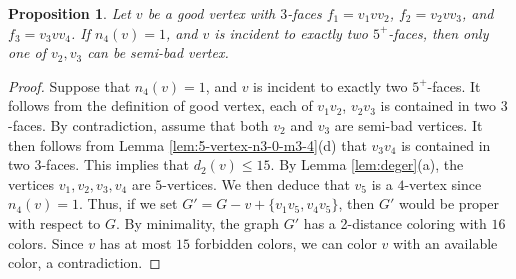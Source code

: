 \documentclass[12pt, reqno]{amsart}
\theoremstyle{plain}
\newtheorem{proposition}[equation]{Proposition}
\theoremstyle{definition}
\numberwithin{equation}{section}
\begin{document}
\begin{proposition}\label{prop:good-no-two-semi-bad}
Let $v$ be a good vertex with $3$-faces $f_1=v_1vv_2$, $f_2=v_2vv_3$, and $f_3=v_3vv_4$. If $n_4(v)=1$, and $v$ is incident to exactly two $5^+$-faces, then only one of $v_2,v_3$ can be semi-bad vertex. 
\end{proposition}
\begin{proof}
Suppose that $n_4(v)=1$, and $v$ is incident to exactly two $5^+$-faces. It follows from the definition of good vertex, each of $v_1v_2$, $v_2v_3$ is contained in two $3$-faces. By contradiction, assume that both $v_2$ and $v_3$ are semi-bad vertices. It then follows from Lemma \ref{lem:5-vertex-n3-0-m3-4}(d) that $v_3v_4$ is contained in two $3$-faces. This implies that  $d_2(v)\leq 15$. By Lemma \ref{lem:deger}(a), the vertices $v_1,v_2,v_3,v_4$ are $5$-vertices. We then deduce that $v_5$ is a $4$-vertex since $n_4(v)=1$. Thus, if we set $G'=G-v+\{v_1v_5,v_4v_5\}$, then  $G'$ would be proper with respect to $G$.
By minimality, the graph $G'$ has a 2-distance coloring with $16$ colors.  Since $v$ has at most $15$ forbidden colors, we can color $v$ with an available color, a contradiction.
\end{proof}
\end{document}
